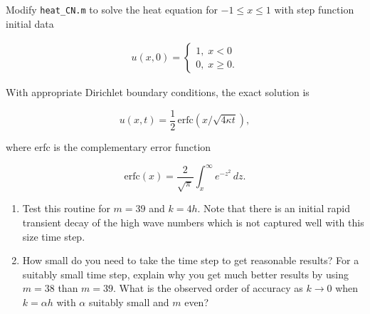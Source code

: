 Modify \texttt{heat\_CN.m} to solve the heat equation for $-1 \leq x \leq 1$ with step function initial data

\begin{align*}
    u(x,0) = \begin{cases}
          1, \; x < 0 \\
          0, \; x \geq 0.
    \end{cases}
\end{align*} 

With appropriate Dirichlet boundary conditions, the exact solution is

$$
    u(x,t) = \frac{1}{2} \, \text{erfc} \left(x / \sqrt{4 \kappa t}\right),
$$

where erfc is the complementary error function

$$
\text{erfc}(x) = \frac{2}{\sqrt{\pi}} \int_x^\infty e^{-z^2}\,dz.
$$

\begin{enumerate}
    \item
    Test this routine for $m = 39$ and $k = 4h$. Note that there is an initial rapid transient decay of the high wave 
    numbers which is not captured well with this size time step.
    
    \item
    How small do you need to take the time step to get reasonable results? For a suitably small time step, explain why
    you get much better results by using $m = 38$ than $m = 39$.  What is the observed order of accuracy as $k \to 0$ 
    when $k = \alpha h$ with $\alpha$ suitably small and $m$ even?
\end{enumerate}


